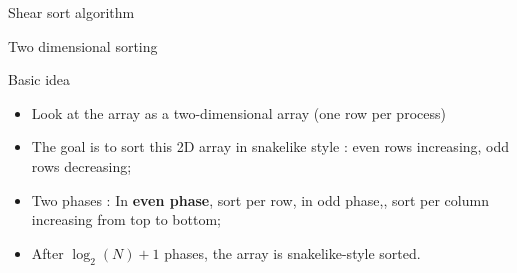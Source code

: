 \documentclass[compress,10pt,aspectratio=169]{beamer}
\begin{document}
\begin{frame}[fragile]{Shear sort algorithm}
  \scriptsize
  \begin{center}{\small Two dimensional sorting}\end{center}

  \begin{block}{\small Basic idea}
    \begin{itemize}
    \item Look at the array as a two-dimensional array (one row per process)
    \item The goal is to sort this 2D array in snakelike style : even rows increasing, odd rows decreasing;
    \item Two phases : In \textbf{even phase}, sort per row,
      in {odd phase,}, sort per column increasing from top to bottom;
    \item After $\log_{2}(N)+1$ phases, the array is snakelike-style sorted.
    \end{itemize}
  \end{block}


\end{frame}
\end{document}
